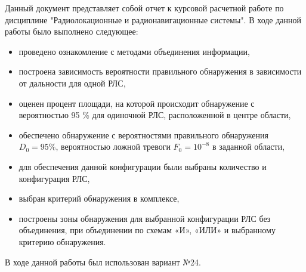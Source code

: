 \Introduction

Данный документ представляет собой отчет к курсовой расчетной работе по дисциплине "Радиолокационные и радионавигационные системы". 
В ходе данной работы было выполнено следующее: 
\begin{itemize}
    \item проведено ознакомление с методами объединения информации, 
    \item построена зависимость вероятности правильного обнаружения в зависимости от дальности для одной РЛС, 
    \item оценен процент площади, на которой происходит обнаружение с вероятностью 95 \% для одиночной РЛС, расположенной в центре области, 
    \item обеспечено обнаружение с вероятностями правильного обнаружения $D_0 = 95 \%$, вероятностью ложной тревоги $F_0 = 10^{-8}$ в заданной области, 
    \item для обеспечения данной конфигурации были выбраны количество и конфигурация РЛС, 
    \item  выбран критерий обнаружения в комплексе, 
    \item  построены зоны обнаружения для выбранной конфигурации РЛС без объединения, при объединении по схемам «И», «ИЛИ» и выбранному критерию обнаружения. 
\end{itemize} 

В ходе данной работы был использован вариант №24. 